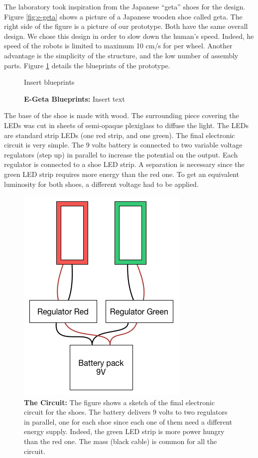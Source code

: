 \documentclass[oneside, a4paper, 12pt]{memoir}
\let\oldCaption\caption
\renewcommand{\caption}[2]{
\oldCaption[#1]{{\small\sffamily\bfseries #1:} #2}
}
\begin{document}
	The laboratory took inspiration from the Japanese \enquote{geta} shoes for the design. Figure \ref{fig:e-geta} shows a picture of a Japanese wooden shoe called geta. The right side of the figure is a picture of our prototype. Both have the same overall design. We chose this design in order to slow down the human's speed. Indeed, he speed of the robots is limited to maximum 10 cm/s for per wheel. Another advantage is the simplicity of the structure, and the low number of assembly parts. Figure \ref{fig:e-geta_blueprints} details the blueprints of the prototype.
	
	\begin{figure}
		Insert blueprints
		
		\caption{E-Geta Blueprints}{Insert text}
		\label{fig:e-geta_blueprints}
	\end{figure}
	
	The base of the shoe is made with wood. The surrounding piece covering the LEDs was cut in sheets of semi-opaque plexiglass to diffuse the light. The LEDs are standard strip LEDs (one red strip, and one green). The final electronic circuit is very simple. The 9 volts battery is connected to two variable voltage regulators (step up) in parallel to increase the potential on the output. Each regulator is connected to a shoe LED strip. A separation is necessary since the green LED strip requires more energy than the red one. To get an equivalent luminosity for both shoes, a different voltage had to be applied.
	
	\begin{figure}\centering
		\includegraphics[scale=0.5]{figures/circuit.png}
		\caption{The Circuit}{The figure shows a sketch of the final electronic circuit for the shoes. The battery delivers 9 volts to two regulators in parallel, one for each shoe since each one of them need a different energy supply. Indeed, the green LED strip is more power hungry than the red one. The mass (black cable) is common for all the circuit.}
		\label{fig:circuit}
	\end{figure}
	
\end{document}
